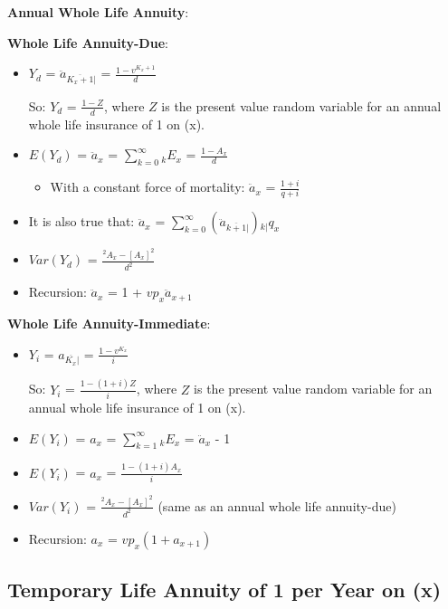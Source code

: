 \documentclass[]{book}
\providecommand{\tightlist}{%
  \setlength{\itemsep}{0pt}\setlength{\parskip}{0pt}}
\begin{document}
\textbf{Annual Whole Life Annuity}:

\textbf{Whole Life Annuity-Due}:

\begin{itemize}
\item
  \(Y_d\) = \(\ddot{a}_{\overline{K_x + 1}|}\) =
  \(\frac{1 - v^{K_x + 1}}{d}\)

  So: \(Y_d\) = \(\frac{1 - Z}{d}\), where \(Z\) is the present value
  random variable for an annual whole life insurance of 1 on (x).
\item
  \(E(Y_d)\) = \(\ddot{a}_x\) = \(\sum^{\infty}_{k = 0} {}_{k}E_x\) =
  \(\frac{1 - A_x}{d}\)

  \begin{itemize}
  \tightlist
  \item
    With a constant force of mortality: \(\ddot{a}_x\) =
    \(\frac{1 + i}{q + i}\)
  \end{itemize}
\item
  It is also true that: \(\ddot{a}_x\) =
  \(\sum^{\infty}_{k = 0} (\ddot{a}_{\overline{k+1}|}){}_{k|}q_x\)
\item
  \(Var(Y_d)\) = \(\frac{^2A_x - [A_x]^2}{d^2}\)
\item
  Recursion: \(\ddot{a}_x\) = 1 + \(vp_x\ddot{a}_{x + 1}\)
\end{itemize}

\textbf{Whole Life Annuity-Immediate}:

\begin{itemize}
\item
  \(Y_i\) = \(a_{\overline{K_x}|}\) = \(\frac{1 - v^{K_x}}{i}\)

  So: \(Y_i\) = \(\frac{1 - (1 + i)Z}{i}\), where \(Z\) is the present
  value random variable for an annual whole life insurance of 1 on (x).
\item
  \(E(Y_i)\) = \(a_x\) = \(\sum^{\infty}_{k = 1} {}_{k}E_x\) =
  \(\ddot{a}_x\) - 1
\item
  \(E(Y_i)\) = \(a_x\) = \(\frac{1 - (1 + i)A_x}{i}\)
\item
  \(Var(Y_i)\) = \(\frac{^2A_x - [A_x]^2}{d^2}\) (same as an annual
  whole life annuity-due)
\item
  Recursion: \(a_x\) = \(vp_x(1 + a_{x + 1})\)
\end{itemize}

\subsection{Temporary Life Annuity of 1 per Year on
(x)}\label{temporary-life-annuity-of-1-per-year-on-x}
\end{document}
